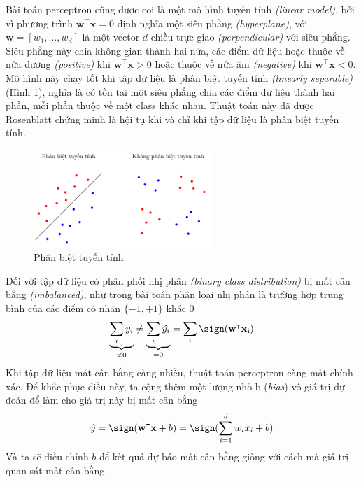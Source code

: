Bài toán perceptron cũng được coi là một mô hình tuyến tính \textit{(linear model)}, bởi vì phương trình $\mathbf{w^\intercal x}=0$ định nghĩa một siêu phẳng \textit{(hyperplane)}, với $\mathbf{w}=[w_1,\dots,w_d]$ là một vector $d$ chiều trực giao \textit{(perpendicular)} với siêu phẳng. Siêu phẳng này chia không gian thành hai nửa, các điểm dữ liệu hoặc thuộc về nửa dương \textit{(positive)} khi $\mathbf{w^\intercal x}>0$ hoặc thuộc về nửa âm \textit{(negative)} khi $\mathbf{w^\intercal x}<0$. Mô hình này chạy tốt khi tập dữ liệu là phân biệt tuyến tính \textit{(linearly separable)} (Hình \ref{figure:linearly-separable}), nghĩa là có tồn tại một siêu phẳng chia các điểm dữ liệu thành hai phần, mỗi phần thuộc về một class khác nhau. Thuật toán này đã được Rosenblatt chứng minh là hội tụ khi và chỉ khi tập dữ liệu là phân biệt tuyến tính.\cite{Aggarwal2023}
\begin{figure}[htbp]
    \centering
    \includegraphics[width=0.6\textwidth]{tikz_image/linearly_separable.pdf}
    \caption{Phân biệt tuyến tính}
    \label{figure:linearly-separable}
\end{figure}

Đối với tập dữ liệu có phân phối nhị phân \textit{(binary class distribution)} bị mất cân bằng \textit{(imbalanced)}, như trong bài toán phân loại nhị phân là trường hợp trung bình của các điểm có nhãn $\{-1, +1\}$ khác $0$
\begin{align}
    \underbrace{\sum_i y_i}_{\neq 0}\neq\underbrace{\sum_i\hat{y_i}}_{=0}=\sum_i\sign(\mathbf{w}^\intercal\mathbf{x_i})
\end{align}
Khi tập dữ liệu mất cân bằng càng nhiều, thuật toán perceptron càng mất chính xác. Để khắc phục điều này, ta cộng thêm một lượng nhỏ b (\textit{bias}) vô giá trị dự đoán để làm cho giá trị này bị mất cân bằng
\begin{align}
    \hat{y}=\sign(\mathbf{w^\intercal x}+b)=\sign(\sum^d_{i=1}w_ix_i+b)
\end{align}
Và ta sẽ điều chỉnh $b$ để kết quả dự báo mất cân bằng giống với cách mà giá trị quan sát mất cân bằng.

